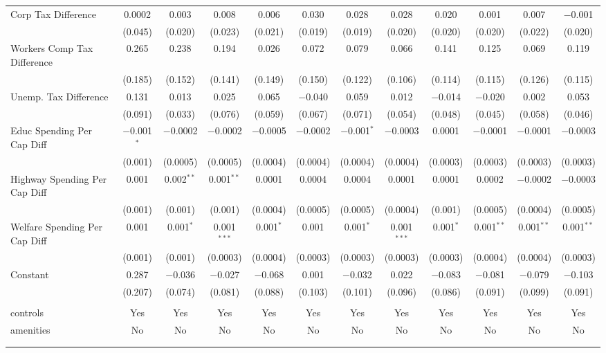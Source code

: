 \begin{table}[!htbp]
\begin{tabular}{@{\extracolsep{5pt}}lccccccccccc}
  Corp Tax Difference & 0.0002 & 0.003 & 0.008 & 0.006 & 0.030 & 0.028 & 0.028 & 0.020 & 0.001 & 0.007 & $-$0.001 \\ 
  & (0.045) & (0.020) & (0.023) & (0.021) & (0.019) & (0.019) & (0.020) & (0.020) & (0.020) & (0.022) & (0.020) \\ 
  Workers Comp Tax Difference & 0.265 & 0.238 & 0.194 & 0.026 & 0.072 & 0.079 & 0.066 & 0.141 & 0.125 & 0.069 & 0.119 \\ 
  & (0.185) & (0.152) & (0.141) & (0.149) & (0.150) & (0.122) & (0.106) & (0.114) & (0.115) & (0.126) & (0.115) \\ 
  Unemp. Tax Difference & 0.131 & 0.013 & 0.025 & 0.065 & $-$0.040 & 0.059 & 0.012 & $-$0.014 & $-$0.020 & 0.002 & 0.053 \\ 
  & (0.091) & (0.033) & (0.076) & (0.059) & (0.067) & (0.071) & (0.054) & (0.048) & (0.045) & (0.058) & (0.046) \\ 
  Educ Spending Per Cap Diff & $-$0.001$^{*}$ & $-$0.0002 & $-$0.0002 & $-$0.0005 & $-$0.0002 & $-$0.001$^{*}$ & $-$0.0003 & 0.0001 & $-$0.0001 & $-$0.0001 & $-$0.0003 \\ 
  & (0.001) & (0.0005) & (0.0005) & (0.0004) & (0.0004) & (0.0004) & (0.0004) & (0.0003) & (0.0003) & (0.0003) & (0.0003) \\ 
  Highway Spending Per Cap Diff & 0.001 & 0.002$^{**}$ & 0.001$^{**}$ & 0.0001 & 0.0004 & 0.0004 & 0.0001 & 0.0001 & 0.0002 & $-$0.0002 & $-$0.0003 \\ 
  & (0.001) & (0.001) & (0.001) & (0.0004) & (0.0005) & (0.0005) & (0.0004) & (0.001) & (0.0005) & (0.0004) & (0.0005) \\ 
  Welfare Spending Per Cap Diff & 0.001 & 0.001$^{*}$ & 0.001$^{***}$ & 0.001$^{*}$ & 0.001 & 0.001$^{*}$ & 0.001$^{***}$ & 0.001$^{*}$ & 0.001$^{**}$ & 0.001$^{**}$ & 0.001$^{**}$ \\ 
  & (0.001) & (0.001) & (0.0003) & (0.0004) & (0.0003) & (0.0003) & (0.0003) & (0.0003) & (0.0004) & (0.0004) & (0.0003) \\ 
  Constant & 0.287 & $-$0.036 & $-$0.027 & $-$0.068 & 0.001 & $-$0.032 & 0.022 & $-$0.083 & $-$0.081 & $-$0.079 & $-$0.103 \\ 
  & (0.207) & (0.074) & (0.081) & (0.088) & (0.103) & (0.101) & (0.096) & (0.086) & (0.091) & (0.099) & (0.091) \\ 
 \hline \\[-1.8ex] 
controls & Yes & Yes & Yes & Yes & Yes & Yes & Yes & Yes & Yes & Yes & Yes \\ 
amenities & No & No & No & No & No & No & No & No & No & No & No \\ 
\hline \\[-1.8ex] 
\hline 
\hline \\[-1.8ex] 
\end{tabular} 
\end{table} 
